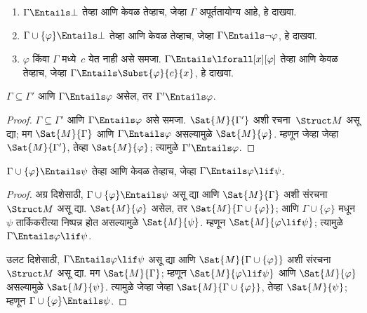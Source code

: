 \begin{prob}
\begin{enumerate}
\item $\Gamma \Entails \bot$ तेव्हा आणि केवळ तेव्हाच, जेव्हा $\Gamma$
  अपूर्ततायोग्य आहे, हे दाखवा.
\item $\Gamma \cup \{\varphi\} \Entails \bot$ तेव्हा आणि केवळ तेव्हाच,
  जेव्हा $\Gamma \Entails \lnot \varphi$, हे दाखवा.
\item $\varphi$ किंवा $\Gamma$ मध्ये~$c$ येत नाही असे समजा.
  $\Gamma \Entails \lforall[x][\varphi]$ तेव्हा आणि केवळ तेव्हाच, जेव्हा
  $\Gamma \Entails \Subst{\varphi}{c}{x}$, हे दाखवा.
\end{enumerate}
\end{prob}

\begin{prop}
$\Gamma \subseteq \Gamma'$ आणि $\Gamma \Entails \varphi$ असेल, तर
$\Gamma' \Entails \varphi$.
\end{prop}

\begin{proof}
$\Gamma \subseteq \Gamma'$ आणि $\Gamma \Entails \varphi$ असे समजा.
$\Sat{M}{\Gamma'}$ अशी रचना~$\Struct M$ असू द्या; मग
$\Sat{M}{\Gamma}$ आणि $\Gamma \Entails \varphi$ असल्यामुळे
$\Sat{M}{\varphi}$. म्हणून जेव्हा जेव्हा $\Sat{M}{\Gamma'}$, तेव्हा
$\Sat{M}{\varphi}$; त्यामुळे $\Gamma' \Entails \varphi$.
\end{proof}


\begin{thm}
\label{fol:syn:sem:thm:sem-deduction}
$\Gamma \cup \{\varphi\} \Entails \psi$ तेव्हा आणि केवळ तेव्हाच, जेव्हा
$\Gamma \Entails \varphi \lif \psi$.
\end{thm}

\begin{proof}
अग्र दिशेसाठी, $\Gamma \cup \{ \varphi \} \Entails \psi$ असू द्या आणि
$\Sat{M}{\Gamma}$ अशी संरचना~$\Struct M$ असू द्या.
$\Sat{M}{\varphi}$ असेल, तर $\Sat{M}{\Gamma \cup \{ \varphi \} }$; आणि
$\Gamma \cup \{ \varphi \}$ मधून~$\psi$ तार्किकरीत्या निष्पन्न होत असल्यामुळे
$\Sat{M}{\psi}$. म्हणून $\Sat{M}{\varphi \lif \psi}$; त्यामुळे
$\Gamma \Entails \varphi \lif \psi$.

उलट दिशेसाठी, $\Gamma \Entails \varphi \lif \psi$ असू द्या आणि
$\Sat{M}{\Gamma \cup \{ \varphi \}}$ अशी संरचना~$\Struct M$ असू
द्या. मग $\Sat{M}{\Gamma}$; म्हणून $\Sat{M}{\varphi \lif \psi}$ आणि
$\Sat{M}{\varphi}$ असल्यामुळे $\Sat{M}{\psi}$. त्यामुळे जेव्हा जेव्हा
$\Sat{M}{\Gamma \cup \{ \varphi \} }$, तेव्हा $\Sat{M}{\psi}$; म्हणून
$\Gamma \cup \{ \varphi \} \Entails \psi$.
\end{proof}

